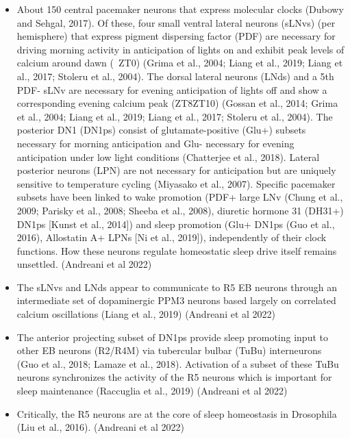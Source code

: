 \documentclass[11pt]{article}
\begin{document}
\begin{itemize}
    \item About 150 central pacemaker neurons that express molecular clocks (Dubowy and Sehgal, 2017). Of these,
    four small ventral lateral neurons (sLNvs) (per hemisphere) that express pigment dispersing factor (PDF) are
    necessary for driving morning activity in anticipation of lights on and exhibit peak levels of calcium around
    dawn (~ZT0) (Grima et al., 2004; Liang et al., 2019; Liang et al., 2017; Stoleru et al., 2004).
    The dorsal lateral neurons (LNds) and a 5th PDF- sLNv are necessary for evening anticipation of lights off and
    show a corresponding evening calcium peak (ZT8ZT10)
    (Gossan et al., 2014; Grima et al., 2004; Liang et al., 2019; Liang et al., 2017; Stoleru et al., 2004).
    The posterior DN1 (DN1ps) consist of glutamate-positive (Glu+) subsets necessary for morning anticipation
    and Glu- necessary for evening anticipation under low light conditions (Chatterjee et al., 2018).
    Lateral posterior neurons (LPN) are not necessary for anticipation but are uniquely sensitive to temperature cycling
    (Miyasako et al., 2007). Specific pacemaker subsets have been linked to wake promotion
    (PDF+ large LNv (Chung et al., 2009; Parisky et al., 2008; Sheeba et al., 2008), diuretic hormone 31 (DH31+)
    DN1ps [Kunst et al., 2014]) and sleep promotion (Glu+ DN1ps (Guo et al., 2016),
    Allostatin A+ LPNs [Ni et al., 2019]), independently of their clock functions.
    How these neurons regulate homeostatic sleep drive itself remains unsettled.
    \cite{andreaniCircadianProgrammingEllipsoid2022} (Andreani et al 2022)

    \item The sLNvs and LNds appear to communicate to R5 EB neurons through an intermediate set of dopaminergic PPM3 neurons based largely on correlated calcium oscillations (Liang et al., 2019)
    \cite{andreaniCircadianProgrammingEllipsoid2022} (Andreani et al 2022)

    \item The anterior projecting subset of DN1ps provide sleep promoting input to other EB neurons (R2/R4M) via tubercular bulbar (TuBu) interneurons (Guo et al., 2018; Lamaze et al., 2018). Activation of a subset of these TuBu neurons synchronizes the activity of the R5 neurons which is important for sleep maintenance (Raccuglia et al., 2019)
    \cite{andreaniCircadianProgrammingEllipsoid2022} (Andreani et al 2022)

    \item Critically, the R5 neurons are at the core of sleep homeostasis in Drosophila (Liu et al., 2016).
    \cite{andreaniCircadianProgrammingEllipsoid2022} (Andreani et al 2022)


\end{itemize}
\end{document}
